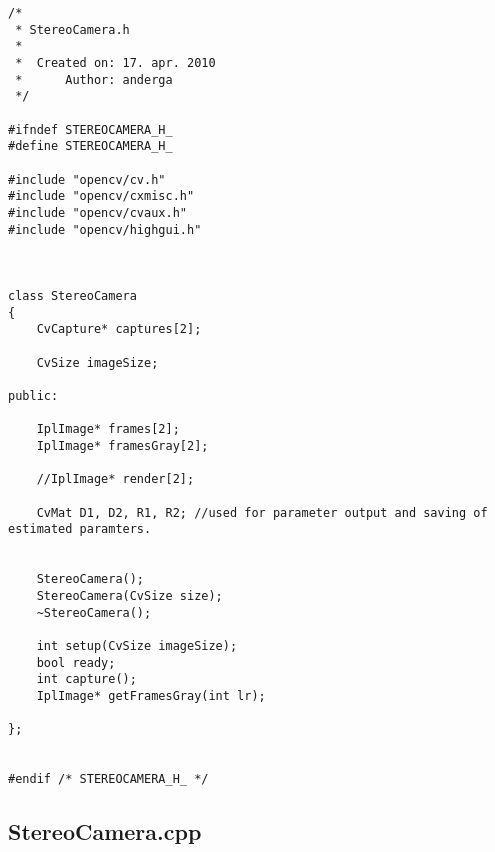 \begin{lstlisting}
/*
 * StereoCamera.h
 *
 *  Created on: 17. apr. 2010
 *      Author: anderga
 */

#ifndef STEREOCAMERA_H_
#define STEREOCAMERA_H_

#include "opencv/cv.h"
#include "opencv/cxmisc.h"
#include "opencv/cvaux.h"
#include "opencv/highgui.h"



class StereoCamera
{
    CvCapture* captures[2];

    CvSize imageSize;

public:

    IplImage* frames[2];
    IplImage* framesGray[2];

    //IplImage* render[2];

    CvMat D1, D2, R1, R2; //used for parameter output and saving of estimated paramters.


    StereoCamera();
    StereoCamera(CvSize size);
    ~StereoCamera();

    int setup(CvSize imageSize);
    bool ready;
    int capture();
    IplImage* getFramesGray(int lr);

};


#endif /* STEREOCAMERA_H_ */

\end{lstlisting}


\subsection{StereoCamera.cpp}

